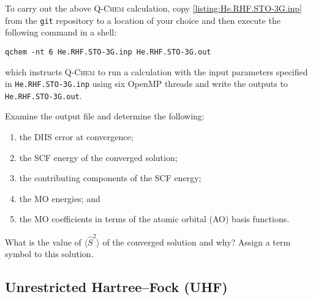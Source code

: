 			To carry out the above \textsc{Q-Chem} calculation, copy \cref{listing:He.RHF.STO-3G.inp} from the \texttt{git} repository to a location of your choice and then execute the following command in a shell:
				\begin{lstlisting}[style = custombash]
					qchem -nt 6 He.RHF.STO-3G.inp He.RHF.STO-3G.out
				\end{lstlisting}
			which instructs \textsc{Q-Chem} to run a calculation with the input parameters specified in \texttt{He.RHF.STO-3G.inp} using six OpenMP threads and write the outputs to \texttt{He.RHF.STO-3G.out}.
				\begin{Task}
					Examine the output file and determine the following:
					\begin{enumerate}[topsep=0pt,itemsep=-1ex,partopsep=1ex,parsep=1ex,label=(\alph*)]
						\item the DIIS error at convergence;
						\item the SCF energy of the converged solution;
						\item the contributing components of the SCF energy;
						\item the MO energies; and
						\item the MO coefficients in terms of the atomic orbital (AO) basis functions.
					\end{enumerate}
					What is the value of $\langle \hat{S}^2 \rangle$ of the converged solution and why? Assign a term symbol to this solution.
				\end{Task}

		
	\subsection{Unrestricted Hartree--Fock (UHF)}
		
